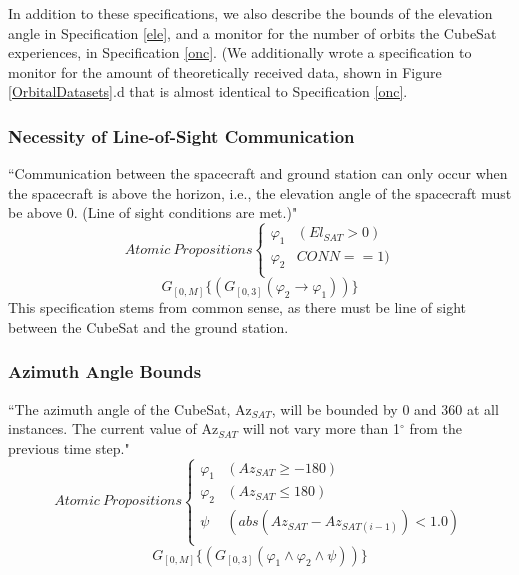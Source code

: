 \documentclass[conf]{new-aiaa}
\begin{document}
In addition to these specifications, we also describe the bounds of the elevation angle in Specification \ref{ele}, and a monitor for the number of orbits the CubeSat experiences, in Specification \ref{onc}. (We additionally wrote a specification to monitor for the amount of theoretically received data, shown in Figure \ref{OrbitalDatasets}.d that is almost identical to Specification \ref{onc}.

\subsubsection{\textbf{Necessity of Line-of-Sight Communication}}
\label{los}
“Communication between the spacecraft and ground station can only occur when the spacecraft is above the horizon, i.e., the elevation angle of the spacecraft must be above 0. (Line of sight conditions are met.)"
\[ Atomic\:Propositions \begin{cases}
  \varphi_1 & (El_{SAT} > 0) \\
  \varphi_2 & CONN == 1) \\
\end{cases} \]
\begin{equation}
    \label{Spec 1}
    G_{[0,M]} \{(G_{[0,3]}(\varphi_2 \rightarrow \varphi_1))\}
\end{equation} 
This specification stems from common sense, as there must be line of sight between the CubeSat and the ground station.

\subsubsection{\textbf{Azimuth Angle Bounds}}
\label{azimuth}
“The azimuth angle of the CubeSat, Az$_{SAT}$, will be bounded by 0 and 360 at all instances. The current value of Az$_{SAT}$ will not vary more than 1$^{\circ}$ from the previous time step."
\[ Atomic\:Propositions \begin{cases}
  \varphi_1 & (Az_{SAT} \geq -180) \\
  \varphi_2 & (Az_{SAT} \leq 180) \\
  \psi & (abs(Az_{SAT} - Az_{SAT(i-1)}) < 1.0) \\
\end{cases} \]
\begin{equation}
    \label{Spec 2}
    G_{[0,M]} \{(G_{[0,3]}(\varphi_1 \wedge \varphi_2 \wedge \psi))\}
\end{equation} 
\end{document}
